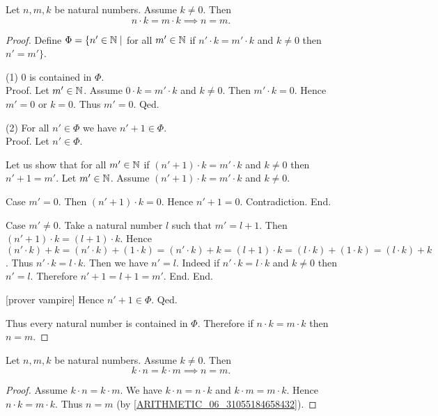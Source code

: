 \documentclass[10pt]{article}
\begin{document}
  \begin{forthel}
    \begin{proposition}
      Let $n, m, k$ be natural numbers.
      Assume $k \neq 0$.
      Then \[ n \cdot k = m \cdot k \implies n = m. \]
    \end{proposition}
    \begin{proof}
      Define $\Phi = \{ n' \in \mathbb{N} \mid$ for all $m' \in \mathbb{N}$ if
      $n' \cdot k = m' \cdot k$ and $k \neq 0$ then $n' = m' \}$.

      (1) $0$ is contained in $\Phi$. \\
      Proof.
        Let $m' \in \mathbb{N}$.
        Assume $0 \cdot k = m' \cdot k$ and $k \neq 0$.
        Then $m' \cdot k = 0$.
        Hence $m' = 0$ or $k = 0$.
        Thus $m' = 0$.
      Qed.

      (2) For all $n' \in \Phi$ we have $n' + 1 \in \Phi$. \\
      Proof.
        Let $n' \in \Phi$.

        Let us show that for all $m' \in \mathbb{N}$ if $(n' + 1) \cdot k =
        m' \cdot k$ and $k \neq 0$ then $n' + 1 = m'$.
          Let $m' \in \mathbb{N}$.
          Assume $(n' + 1) \cdot k = m' \cdot k$ and $k \neq 0$.

          Case $m' = 0$.
            Then $(n' + 1) \cdot k = 0$.
            Hence $n' + 1 = 0$.
            Contradiction.
          End.

          Case $m' \neq 0$.
            Take a natural number $l$ such that $m' = l + 1$.
            Then $(n' + 1) \cdot k = (l + 1) \cdot k$.
            Hence $(n' \cdot k) + k
              = (n' \cdot k) + (1 \cdot k)
              = (n' \cdot k) + k
              = (l + 1) \cdot k
              = (l \cdot k) + (1 \cdot k)
              = (l \cdot k) + k$.
            Thus $n' \cdot k = l \cdot k$.
            Then we have $n' = l$.
            Indeed if $n' \cdot k = l \cdot k$ and $k \neq 0$ then $n' = l$.
            Therefore $n' + 1 = l + 1 = m'$.
          End.
        End.

        [prover vampire]
        Hence $n' + 1 \in \Phi$.
      Qed.

      Thus every natural number is contained in $\Phi$.
      Therefore if $n \cdot k = m \cdot k$ then $n = m$.
    \end{proof}
  \end{forthel}

  \begin{forthel}
    \begin{corollary}
      Let $n, m, k$ be natural numbers.
      Assume $k \neq 0$.
      Then \[ k \cdot n = k \cdot m \implies n = m. \]
    \end{corollary}
    \begin{proof}
      Assume $k \cdot n = k \cdot m$.
      We have $k \cdot n = n \cdot k$ and $k \cdot m = m \cdot k$.
      Hence $n \cdot k = m \cdot k$.
      Thus $n = m$ (by \cref{ARITHMETIC_06_31055184658432}).
    \end{proof}
  \end{forthel}
\end{document}
